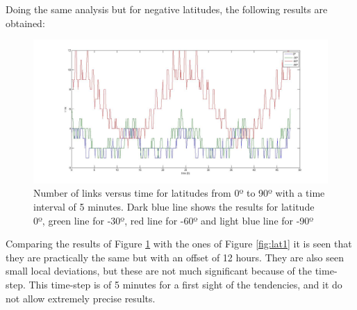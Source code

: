 Doing the same analysis but for negative latitudes, the following results are obtained:
\begin{figure}[H]
\begin{center}
\includegraphics[scale=0.30]{0_-30_-90_lat.jpg}
\caption[Links vs time for latitudes from 0º to -90º]{Number of links versus time for latitudes from 0º to 90º with a time interval of 5 minutes. Dark blue line shows the results for latitude 0º, green line for -30º, red line for -60º and light blue line for -90º}
\label{fig:lat2}
\end{center}
\end{figure}
Comparing the results of Figure \ref{fig:lat2} with the ones of Figure \ref{fig:lat1} it is seen that they are practically the same but with an offset of 12 hours. They are also seen small local deviations, but these are not much significant because of the time-step. This time-step is of 5 minutes for a first sight of the tendencies, and it do not allow extremely precise results.

